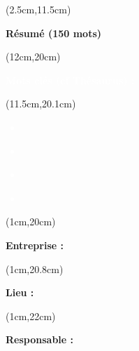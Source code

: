 \begin{titlepage}
    \begin{textblock*}{16cm}(2.5cm,11.5cm)
        \makeatletter
        \noindent
        \normalsize
        \selectfont
        \begin{center}
            \textbf{\textcolor{bleuRoiUTT}{Résumé (150 mots)}}
        \end{center}
        \begin{flushleft}
            \justifying
            \thetitle
        \end{flushleft}
        \makeatother
    \end{textblock*}

    \begin{textblock*}{7.8cm}(12cm,20cm)
        \normalsize
        \begin{center}
            \textbf{\textcolor{white}{Mots clés (cf Thésaurus) :}}
        \end{center}
    \end{textblock*}

    \begin{textblock*}{10cm}(11.5cm,20.1cm)
        \small
        \begin{flushleft}
            \textcolor{white}{
                \begin{itemize}[label=\textcolor{white}{\textbullet},noitemsep]
                    \item \textbf{\theKone}
                    \item \textbf{\theKtwo}
                    \item \textbf{\theKthree}
                    \item \textbf{\theKfourth}
                \end{itemize}
            }
        \end{flushleft}
    \end{textblock*}

    \begin{textblock*}{7.8cm}(1cm,20cm)
        \normalsize
        \begin{flushleft}
            \textbf{\textcolor{bleuRoiUTT}{Entreprise :} \theEntreprise}
        \end{flushleft}
    \end{textblock*}

    \begin{textblock*}{7.8cm}(1cm,20.8cm)
        \normalsize
        \begin{flushleft}
            \textbf{\textcolor{bleuRoiUTT}{Lieu :} \textit{\mapAddr{\theLieu}}}
        \end{flushleft}
    \end{textblock*}

    \begin{textblock*}{7.8cm}(1cm,22cm)
        \normalsize
        \begin{flushleft}
            \textbf{\textcolor{bleuRoiUTT}{Responsable :} \theREntre}
        \end{flushleft}
    \end{textblock*}

\end{titlepage}

\clearpage %